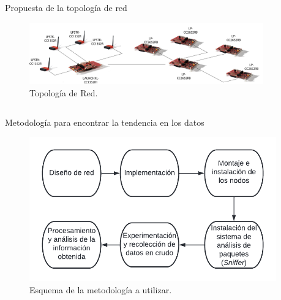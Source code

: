 \documentclass[final]{beamer}
\newlength{\sepwidthA} %
\newlength{\colwidthA} %
\newcommand{\separatorcolumnA}{\begin{column}{\sepwidthA}\end{column}}
\newlength{\sepwidthB}
\newlength{\colwidthB}
\newcommand{\separatorcolumnB}{\begin{column}{\sepwidthB}\end{column}}
\begin{document}
\begin{frame}[t]
\begin{columns}[t]
    \separatorcolumnA
    \begin{column}{\colwidthA}

        \begin{block}{Propuesta de la topología de red}
            \begin{figure}[!Ht]
            \centering
                \includegraphics[width=\linewidth]{Figures/NetworkDistribution_EM2022.png}
                \caption{Topología de Red.}
                \label{fig:top}
            \end{figure}
        \end{block}
    
    \end{column}

    \separatorcolumnA
\end{columns}

\begin{columns}
\separatorcolumnB

    \begin{column}[T]{\colwidthB}

        \begin{block}{Metodología para encontrar la tendencia en los datos}

        \begin{figure}[!Ht]
            \centering
                \includegraphics[width=\linewidth]{Figures/pipeline.png}
                \caption{Esquema de la metodología a utilizar.}
                \label{fig:pipe}
        \end{figure}
    \end{block}
    

\end{column}
\end{columns}
\end{frame}
\end{document}
